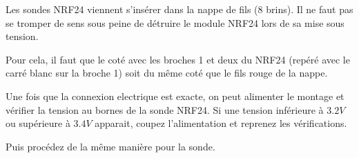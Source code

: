 Les sondes NRF24 viennent s'insérer dans la nappe de fils (8 brins). Il ne faut pas se tromper de sens sous peine de détruire le module NRF24 lors de sa mise sous tension.

Pour cela, il faut que le coté avec les broches 1 et deux du NRF24 (repéré avec le carré blanc sur la broche 1) soit du même coté que le fils rouge de la nappe.



Une fois que la connexion electrique est exacte, on peut alimenter le montage et vérifier la tension au bornes de la sonde NRF24.
Si une tension inférieure à $3.2V$ ou supérieure à $3.4V$ apparait, coupez l'alimentation et reprenez les vérifications.

Puis procédez de la même manière pour la sonde.


